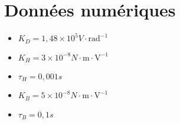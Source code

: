 \section*{Données numériques}
\begin{multicols}{3}
\begin{itemize}
  \item $K_{D}=1,48 \times 10^{5} \si{V} \cdot \mathrm{rad}^{-1}$
  \item $K_{H}=3 \times 10^{-8} \si{N} \cdot \mathrm{m} \cdot \mathrm{V}^{-1}$
  \item $\tau_{H}=0,001 \si{s}$
  \item $K_{B}=5 \times 10^{-8} \si{N} \cdot \mathrm{m} \cdot \mathrm{V}^{-1}$
  \item $\tau_{B}=0,1 \si{s}$
\end{itemize}
\end{multicols}





